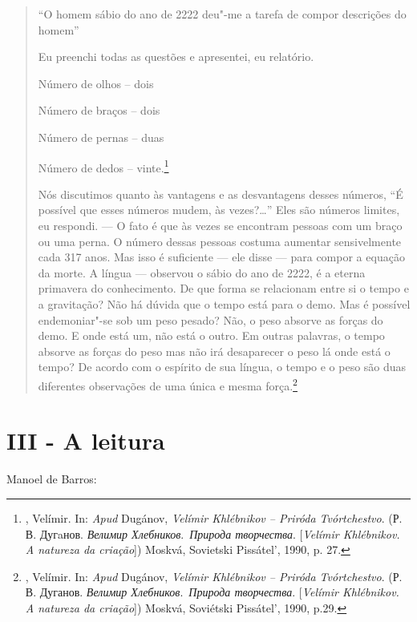 \begin{quote}
``O homem sábio do ano de 2222 deu"-me a tarefa de compor descrições do
homem''

Eu preenchi todas as questões e apresentei, eu relatório.

Número de olhos -- dois

Número de braços -- dois

Número de pernas -- duas

Número de dedos -- vinte.\footnote{, Velímir. In: \emph{Apud}
  Dugánov,  \emph{Velímir Khlébnikov -- Priróda Tvórtchestvo}. (Р.
  В. Дугaнов. \emph{Велимир Хлебников}.~\emph{Природа творчества}.
  {[}\emph{Velímir Khlébnikov. A natureza da criação}{]}) Moskvá,
  Sovietski Pissátel', 1990, p. 27.}

Nós discutimos quanto às vantagens e as desvantagens desses números, ``É
possível que esses números mudem, às vezes?\ldots{}'' Eles são números
limites, eu respondi. --- O fato é que às vezes se encontram pessoas com
um braço ou uma perna. O número dessas pessoas costuma aumentar
sensivelmente cada 317 anos. Mas isso é suficiente --- ele disse --- para
compor a equação da morte. A língua --- observou o sábio do ano de 2222,
é a eterna primavera do conhecimento. De que forma se relacionam entre
si o tempo e a gravitação? Não há dúvida que o tempo está para o demo.
Mas é possível endemoniar"-se sob um peso pesado? Não, o peso absorve as
forças do demo. E onde está um, não está o outro. Em outras palavras, o
tempo absorve as forças do peso mas não irá desaparecer o peso lá onde
está o tempo? De acordo com o espírito de sua língua, o tempo e o peso
são duas diferentes observações de uma única e mesma força.\footnote{,
  Velímir. In: \emph{Apud} Dugánov,  \emph{Velímir Khlébnikov --
  Priróda Tvórtchestvo}. (Р. В. Дуганов. \emph{Велимир
  Хлебников}.~\emph{Природа творчества}. {[}\emph{Velímir Khlébnikov. A
  natureza da criação}{]}) Moskvá, Soviétski Pissátel', 1990, p.29.}
\end{quote}

\section{III - A leitura}

Manoel de Barros:

